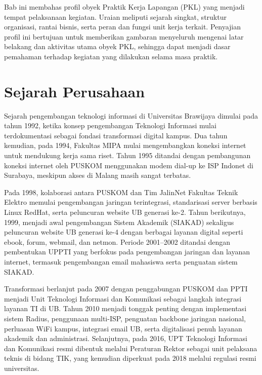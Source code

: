 

Bab ini membahas profil obyek Praktik Kerja Lapangan (PKL) yang menjadi 
tempat pelaksanaan kegiatan. Uraian meliputi sejarah singkat, struktur organisasi, 
rantai bisnis, serta peran dan fungsi unit kerja terkait. Penyajian profil ini 
bertujuan untuk memberikan gambaran menyeluruh mengenai latar belakang 
dan aktivitas utama obyek PKL, sehingga dapat menjadi dasar pemahaman 
terhadap kegiatan yang dilakukan selama masa praktik.

\section{Sejarah Perusahaan}

Sejarah pengembangan teknologi informasi di Universitas Brawijaya dimulai pada tahun 1992, ketika konsep pengembangan Teknologi Informasi mulai terdokumentasi sebagai fondasi transformasi digital kampus. Dua tahun kemudian, pada 1994, Fakultas MIPA mulai mengembangkan koneksi internet untuk mendukung kerja sama riset. Tahun 1995 ditandai dengan pembangunan koneksi internet oleh PUSKOM menggunakan modem dial-up ke ISP Indonet di Surabaya, meskipun akses di Malang masih sangat terbatas. 

Pada 1998, kolaborasi antara PUSKOM dan Tim JalinNet Fakultas Teknik Elektro memulai pengembangan jaringan terintegrasi, standarisasi server berbasis Linux RedHat, serta peluncuran website UB generasi ke-2. Tahun berikutnya, 1999, menjadi awal pengembangan Sistem Akademik (SIAKAD) sekaligus peluncuran website UB generasi ke-4 dengan berbagai layanan digital seperti ebook, forum, webmail, dan netmon. Periode 2001–2002 ditandai dengan pembentukan UPPTI yang berfokus pada pengembangan jaringan dan layanan internet, termasuk pengembangan email mahasiswa serta penguatan sistem SIAKAD. 

Transformasi berlanjut pada 2007 dengan penggabungan PUSKOM dan PPTI menjadi Unit Teknologi Informasi dan Komunikasi sebagai langkah integrasi layanan TI di UB. Tahun 2010 menjadi tonggak penting dengan implementasi sistem Radius, penggunaan multi-ISP, penguatan backbone jaringan nasional, perluasan WiFi kampus, integrasi email UB, serta digitalisasi penuh layanan akademik dan administrasi. Selanjutnya, pada 2016, UPT Teknologi Informasi dan Komunikasi resmi dibentuk melalui Peraturan Rektor sebagai unit pelaksana teknis di bidang TIK, yang kemudian diperkuat pada 2018 melalui regulasi resmi universitas. 

